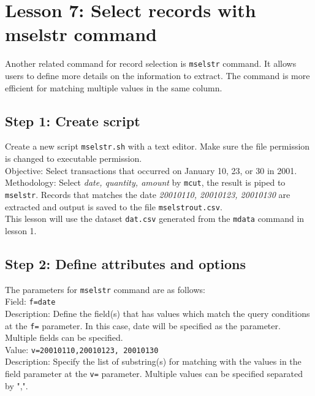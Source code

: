 

%


\section{Lesson 7: Select records with mselstr command}

Another related command for record selection is \verb|mselstr| command. It allows users to define more details on the information to extract. The command is more efficient for matching multiple values in the same column. 


\subsection{Step 1: Create script}

Create a new script \verb|mselstr.sh| with a text editor. Make sure the file permission is changed to executable permission. \\

Objective: Select transactions that occurred on January 10, 23, or 30 in 2001.     \\

Methodology: Select \emph{date, quantity, amount} by \verb|mcut|, the result is piped to \verb|mselstr|. Records that matches the date \emph{20010110, 20010123, 20010130} are extracted and output is saved to the file \verb|mselstrout.csv|. \\ 

This lesson will use the dataset \verb|dat.csv| generated from the \verb|mdata| command in lesson 1. 

 \subsection{Step 2: Define attributes and options }

{\setlength{\parindent}{0cm}

The parameters for \verb|mselstr| command are as follows: \\

Field: 		\verb|f=date| \\
Description: 	Define the field(s) that has values which match the query conditions at the \verb|f=| parameter. In this case, date will be specified as the parameter. Multiple fields can be specified. \\

Value: 		\verb|v=20010110,20010123, 20010130 | \\
Description: 	Specify the list of substring(s) for matching with the values in the field parameter at the \verb|v=| parameter. Multiple values can be specified separated by ",". 

}

